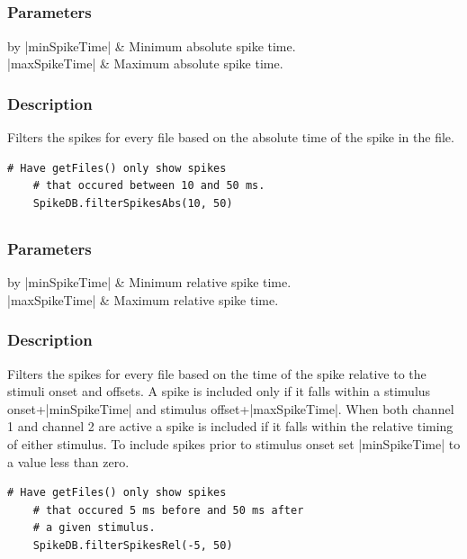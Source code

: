 \documentclass{report}
\begin{document}
\clearpage
\subsection[\method{void}{filterSpikesAbs}]{}
\subsubsection{Parameters}
\begin{center}
\begin{tabular}{by}
	|minSpikeTime| & Minimum absolute spike time.\\
	|maxSpikeTime| & Maximum absolute spike time.\\
\end{tabular}
\end{center}
\subsubsection{Description}
Filters the spikes for every file based on the absolute time of the spike in the file.
\begin{lstlisting}[caption=Example]
	# Have getFiles() only show spikes 
	# that occured between 10 and 50 ms.
	SpikeDB.filterSpikesAbs(10, 50)
\end{lstlisting}

\clearpage
\subsection[\method{void}{filterSpikesRel}]{}
\subsubsection{Parameters}
\begin{table}[h]
\begin{center}
\begin{tabular}{by}
		|minSpikeTime| & Minimum relative spike time.\\
		|maxSpikeTime| & Maximum relative spike time.\\
	\end{tabular}
\end{center}
\end{table}
\subsubsection{Description}
Filters the spikes for every file based on the time of the spike relative to the stimuli onset and offsets. A spike is included only if it falls within a stimulus onset+|minSpikeTime| and stimulus offset+|maxSpikeTime|. When both channel 1 and channel 2 are active a spike is included if it falls within the relative timing of either stimulus. To include spikes prior to stimulus onset set |minSpikeTime| to a value less than zero.
\begin{lstlisting}[caption=Example]
	# Have getFiles() only show spikes 
	# that occured 5 ms before and 50 ms after
	# a given stimulus.
	SpikeDB.filterSpikesRel(-5, 50)
\end{lstlisting}
\end{document}

